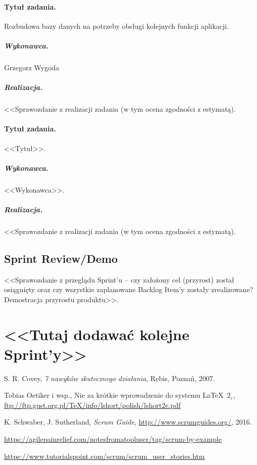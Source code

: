 \documentclass[a4paper]{article}
\begin{document}
\paragraph{Tytuł zadania.}  Rozbudowa bazy danych na potrzeby obsługi kolejnych funkcji aplikacji.
\subparagraph{Wykonawca.} Grzegorz Wygoda
\subparagraph{Realizacja.} <<Sprawozdanie z realizacji zadania (w tym ocena zgodności z estymatą).



\paragraph{Tytuł zadania.} <<Tytuł>>.
\subparagraph{Wykonawca.} <<Wykonawca>>.
\subparagraph{Realizacja.} <<Sprawozdanie z realizacji zadania (w tym ocena zgodności z estymatą).


\subsection{Sprint Review/Demo}
<<Sprawozdanie z przeglądu Sprint'u -- czy założony cel (przyrost) został osiągnięty oraz czy wszystkie zaplanowane Backlog Item'y zostały zrealizowane? Demostracja przyrostu produktu>>.

\section*{<<Tutaj dodawać kolejne Sprint'y>>}


\begin{thebibliography}{9}

 S. R. Covey, {\em 7 nawyków skutecznego działania}, Rebis, Poznań, 2007.

 Tobias Oetiker i wsp., Nie za krótkie wprowadzenie do systemu \LaTeX  \ $2_\varepsilon$, \url{ftp://ftp.gust.org.pl/TeX/info/lshort/polish/lshort2e.pdf}

 K. Schwaber, J. Sutherland, {\em Scrum Guide}, \url{http://www.scrumguides.org/}, 2016.

 \url{https://agilepainrelief.com/notesfromatooluser/tag/scrum-by-example}

 \url{https://www.tutorialspoint.com/scrum/scrum_user_stories.htm}

\end{thebibliography}
\end{document}
